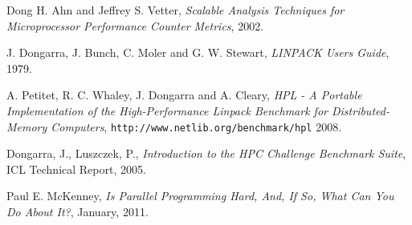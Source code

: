 \documentclass[a4paper]{report}
\begin{document}
\begin{thebibliography}{9}
  Dong H. Ahn and Jeffrey S. Vetter,
  \emph{Scalable Analysis Techniques for Microprocessor Performance Counter
    Metrics},
  2002.
  
  J. Dongarra, J. Bunch, C. Moler and G. W. Stewart, 
  \emph{LINPACK Users Guide},
  1979.
  
  A. Petitet, R. C. Whaley, J. Dongarra and A. Cleary, 
  \emph{HPL - A Portable Implementation of the High-Performance Linpack
    Benchmark for Distributed-Memory Computers}, {\tt http://www.netlib.org/benchmark/hpl}
  2008.

  Dongarra, J., Luszczek, P.,
  \emph{Introduction to the HPC Challenge Benchmark Suite}, ICL Technical Report,
  2005.  
  
  Paul E. McKenney,
  \emph{Is Parallel Programming Hard, And, If So, What Can You Do About It?},
  January, 2011.

\end{thebibliography}
\end{document}
